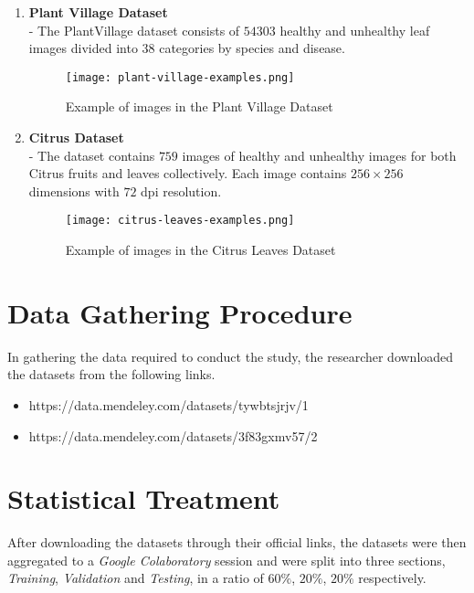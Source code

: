\begin{enumerate}
    \item \textbf{Plant Village Dataset}  \\ 
        - The PlantVillage dataset consists of $54303$ healthy and unhealthy leaf 
         images divided into $38$ categories by species and disease. 
    
         \begin{figure}[H]
            \centering 
            \texttt{[image: plant-village-examples.png]}
            \caption{Example of images in the Plant Village Dataset}
         \end{figure}


    \item \textbf{Citrus Dataset} \\ 
        - The dataset contains $759$ images of healthy and unhealthy images for both Citrus fruits and
         leaves collectively. Each image contains $256 \times 256$ dimensions with $72$ dpi resolution.  \\ 

         \begin{figure}[H]
            \centering 
            \texttt{[image: citrus-leaves-examples.png]}
            \caption{Example of images in the Citrus Leaves Dataset}
         \end{figure}


\end{enumerate}

\section{Data Gathering Procedure}
In gathering the data required to conduct the study, the 
researcher downloaded the datasets from the following links.

\begin{itemize}
    \item https://data.mendeley.com/datasets/tywbtsjrjv/1
    \item https://data.mendeley.com/datasets/3f83gxmv57/2
\end{itemize}


\section{Statistical Treatment}
After downloading the datasets through their official links, 
the datasets were then aggregated to a \emph{Google Colaboratory} 
session and were split into three sections, \emph{Training}, \emph{Validation} and 
\emph{Testing}, in a ratio of $ 60\% $, $ 20\% $, $ 20\% $ respectively. \\

